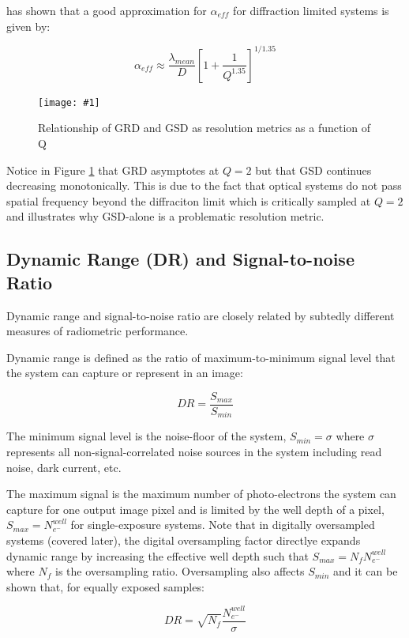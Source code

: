 \documentclass[10pt,journal]{IEEEtran}  %
\newcommand{\includepgf}[3]
{
  \begin{figure}[h!]
  \centering
  \texttt{[image: \#1]}
  \caption[]{#3}
  \label{#2}
  \end{figure}
}
\begin{document}
\cite{auelmann_iq} has shown that a good approximation for $\alpha_{eff}$ for diffraction limited systems is given by:


\begin{equation}
    \alpha_{eff} \approx \frac{\lambda_{mean}}{D}\left[1 + \frac{1}{Q^{1.35}}\right]^{1/1.35}
\label{eq:alpha_eff_approx}
\end{equation}

\includepgf{figures/resolution_q.pgf}{fig:resolution_q}{Relationship of GRD and GSD as resolution metrics as a function of Q}

Notice in Figure \ref{fig:resolution_q} that GRD asymptotes at $Q=2$ but that GSD continues decreasing monotonically.  This is due to the fact that optical systems do not pass spatial frequency beyond the diffraciton limit which is critically sampled at $Q=2$ and illustrates why GSD-alone is a problematic resolution metric.

\subsection{Dynamic Range (DR) and Signal-to-noise Ratio}
Dynamic range and signal-to-noise ratio are closely related by subtedly different measures of radiometric performance.

Dynamic range is defined as the ratio of maximum-to-minimum signal level that the system can capture or represent in an image:

\begin{equation}
DR = \frac{S_{max}}{S_{min}}
\label{eq:DR}
\end{equation}

The minimum signal level is the noise-floor of the system, $S_{min} = \sigma$ where $\sigma$ represents all non-signal-correlated noise sources in the system including read noise, dark current, etc.

The maximum signal is the maximum number of photo-electrons the system can capture for one output image pixel and is limited by the well depth of a pixel, $S_{max} = N_{e^-}^{well}$ for single-exposure systems.  Note that in digitally oversampled systems (covered later), the digital oversampling factor directlye expands dynamic range by increasing the effective well depth such that $S_{max} = N_f N_{e^-}^{well}$ where $N_f$ is the oversampling ratio.  Oversampling also affects $S_{min}$ and it can be shown that, for equally exposed samples:

\begin{equation}
    DR = \sqrt{N_f}\frac{N_{e^-}^{well}}{\sigma}
\label{eq:DR_OS}
\end{equation}
\end{document}
